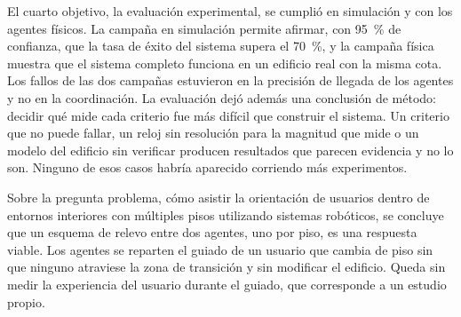 El cuarto objetivo, la evaluación experimental, se cumplió en simulación y con
los agentes físicos. La campaña en simulación permite afirmar, con 95~\% de
confianza, que la tasa de éxito del sistema supera el 70~\%, y la campaña física
muestra que el sistema completo funciona en un edificio real con la misma cota.
Los fallos de las dos campañas estuvieron en la precisión de llegada de los
agentes y no en la coordinación. La evaluación dejó además una conclusión de
método: decidir qué mide cada criterio fue más difícil que construir el sistema.
Un criterio que no puede fallar, un reloj sin resolución para la magnitud que
mide o un modelo del edificio sin verificar producen resultados que parecen evidencia y no lo son. Ninguno de esos casos habría aparecido corriendo más experimentos.

Sobre la pregunta problema, cómo asistir la orientación de usuarios dentro de
entornos interiores con múltiples pisos utilizando sistemas robóticos, se
concluye que un esquema de relevo entre dos agentes, uno por piso, es una
respuesta viable. Los agentes se reparten el guiado de un usuario que cambia
de piso sin que ninguno atraviese la zona de transición y sin modificar el
edificio. Queda sin medir la experiencia del usuario durante el guiado, que corresponde a
un estudio propio.
